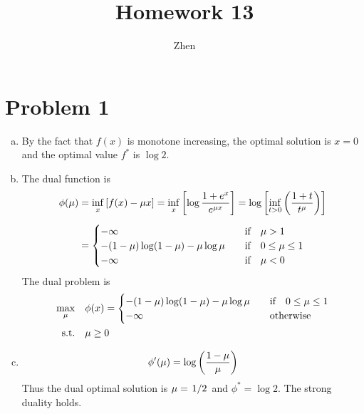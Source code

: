 \documentclass{article}
\begin{document}
\title{Homework 13}
\author{Zhen}
\maketitle

\section*{Problem 1}
\begin{enumerate}[(a)]
	\item 
		By the fact that $f(x)$ is monotone increasing, the optimal solution is $x=0$ and the optimal value $f^*$ is $\log 2$.
	\item
		The dual function is
		\[
		    \begin{aligned}
				\phi(\mu)
				&=
				\inf_x\qty[f(x)-\mu x]
				=
				\inf_x\qty[\log\frac{1+e^x}{e^{\mu x}}]
				=
				\log\qty[\inf_{t>0}\qty(\frac{1+t}{t^\mu})]
				\\[5pt]&=
				\begin{cases}
					-\infty &\qif\mu>1
					\\
					-(1-\mu)\log(1-\mu)-\mu\log\mu
					&\qif0\le\mu\le1
					\\
					-\infty&\qif\mu<0
				\end{cases}
		    \end{aligned}
		\]
		The dual problem is
		\[
		    \begin{aligned}
		        \max_\mu\ \ \ &\phi(x)=
				\begin{cases}
					-(1-\mu)\log(1-\mu)-\mu\log\mu
					&\qif0\le\mu\le1
					\\
					-\infty&\qotherwise
				\end{cases}
				\\
				\qq*{s.t.}&\mu\ge0
		    \end{aligned}
		\]
	\item
		\[
		    \begin{aligned}
				\phi'(\mu)=\log\qty(\frac{1-\mu}{\mu})
		    \end{aligned}
		\]
		Thus the dual optimal solution is $\mu=\flatfrac{1}{2}$ and $\phi^*=\log 2$. The strong duality holds.
\end{enumerate}
\end{document}
